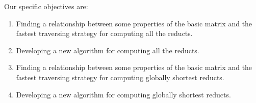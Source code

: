 \documentclass[authoryear,11pt]{elsarticle}
\begin{document}
  Our specific objectives are:
  \begin{enumerate}
  \item Finding a relationship between some properties of the basic matrix and the fastest 
  		traversing strategy for computing all the reducts.
  		  	
  		
  
  \item Developing a new algorithm for computing all the reducts.
  		
  \item Finding a relationship between some properties of the basic matrix and the fastest 
  		traversing strategy for computing globally shortest reducts.
  		  	
  		
  
  \item Developing a new algorithm for computing globally shortest reducts.
%  
  \end{enumerate}
\end{document}
